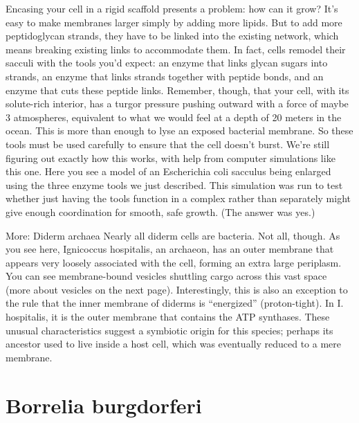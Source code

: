 \documentclass[]{tufte-book}
\begin{document}
Encasing your cell in a rigid scaffold presents a problem: how can it
grow? It's easy to make membranes larger simply by adding more lipids.
But to add more peptidoglycan strands, they have to be linked into the
existing network, which means breaking existing links to accommodate
them. In fact, cells remodel their sacculi with the tools you'd expect:
an enzyme that links glycan sugars into strands, an enzyme that links
strands together with peptide bonds, and an enzyme that cuts these
peptide links. Remember, though, that your cell, with its solute-rich
interior, has a turgor pressure pushing outward with a force of maybe 3
atmospheres, equivalent to what we would feel at a depth of 20 meters in
the ocean. This is more than enough to lyse an exposed bacterial
membrane. So these tools must be used carefully to ensure that the cell
doesn't burst. We're still figuring out exactly how this works, with
help from computer simulations like this one. Here you see a model of an
Escherichia coli sacculus being enlarged using the three enzyme tools we
just described. This simulation was run to test whether just having the
tools function in a complex rather than separately might give enough
coordination for smooth, safe growth. (The answer was yes.)

More: Diderm archaea Nearly all diderm cells are bacteria. Not all,
though. As you see here, Ignicoccus hospitalis, an archaeon, has an
outer membrane that appears very loosely associated with the cell,
forming an extra large periplasm. You can see membrane-bound vesicles
shuttling cargo across this vast space (more about vesicles on the next
page). Interestingly, this is also an exception to the rule that the
inner membrane of diderms is ``energized'' (proton-tight). In I.
hospitalis, it is the outer membrane that contains the ATP synthases.
These unusual characteristics suggest a symbiotic origin for this
species; perhaps its ancestor used to live inside a host cell, which was
eventually reduced to a mere membrane.

\section{Borrelia burgdorferi}\label{borrelia-burgdorferi}
\end{document}
